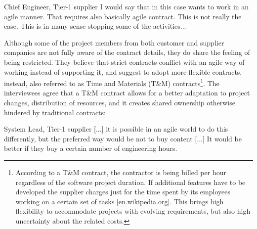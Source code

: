 \begin{aquote}{Chief Engineer, Tier-1 supplier}
I would say that in this case \company{} wants to work in an agile manner. That requires also basically agile contract. This is not really the case. This is in many sense stopping some of the activities...
\end{aquote}
%
%
%


Although some of the project members from both customer and supplier companies are not fully aware of the contract details, they do share the feeling of being restricted. 
%
%
They believe that strict contracts conflict with an agile way of working instead of supporting it, and suggest to adopt more flexible contracts, instead, also referred to as Time and Materials (T\&M) contracts\footnote{According to a T\&M contract, the contractor is being billed per hour regardless of the software project duration. If additional features have to be developed the supplier charges just for the time spent by its employees working on a certain set of tasks [en.wikipedia.org]. This brings high flexibility to accommodate projects with evolving requirements, but also high uncertainty about the related costs.}. 
The interviewees agree that a T\&M contract allows for a better adaptation to project changes, distribution of resources, and it creates shared ownership otherwise hindered by traditional contracts:

\begin{aquote}{System Lead, Tier-1 supplier}
[...] it is possible in an agile world to do this differently, but the preferred way would be not to buy content [...] %
It would be better if they buy a certain number of engineering hours.
\end{aquote}

